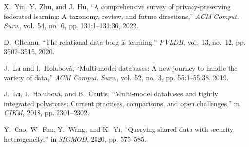 \documentclass[11pt]{article}
\begin{document}
\begin{thebibliography}{10}
X.~Yin, Y.~Zhu, and J.~Hu, ``A comprehensive survey of privacy-preserving
  federated learning: {A} taxonomy, review, and future directions,''
  \emph{{ACM} Comput. Surv.}, vol.~54, no.~6, pp. 131:1--131:36, 2022.

D.~Olteanu, ``The relational data borg is learning,'' \emph{{PVLDB}}, vol.~13,
  no.~12, pp. 3502--3515, 2020.

J.~Lu and I.~Holubov{\'{a}}, ``Multi-model databases: {A} new journey to handle
  the variety of data,'' \emph{{ACM} Comput. Surv.}, vol.~52, no.~3, pp.
  55:1--55:38, 2019.

J.~Lu, I.~Holubov{\'{a}}, and B.~Cautis, ``Multi-model databases and tightly
  integrated polystores: Current practices, comparisons, and open challenges,''
  in \emph{{CIKM}}, 2018, pp. 2301--2302.

Y.~Cao, W.~Fan, Y.~Wang, and K.~Yi, ``Querying shared data with security
  heterogeneity,'' in \emph{{SIGMOD}}, 2020, pp. 575--585.

\end{thebibliography}
\end{document}
